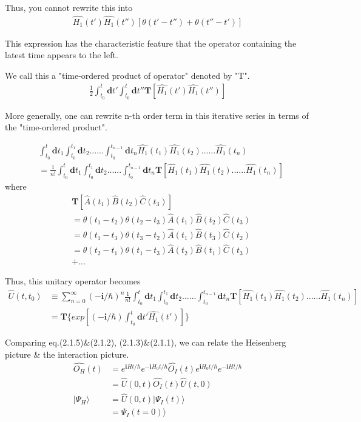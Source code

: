  Thus, you cannot rewrite this into
\begin{align}
\hat{H_1}(t')\hat{H_1}(t'')[\theta(t'-t'')+\theta(t''-t')] \nonumber
\end{align}

 This expression has the characteristic feature that the operator containing the latest  time appears to the left.

 We call this a "time-ordered product of operator" denoted by "T".
\begin{align}
\frac{1}{2}\int_{t_0}^{t}\bm{d}t'\int_{t_0}^{t}\bm{d}t''\bm{T}[\hat{H_1}(t')\hat{H_1}(t'')]\nonumber
\end{align}

 More generally, one can rewrite n-th order term in this iterative series in terms of the "time-ordered product".

\begin{align}\label{2-1-7}
&\int_{t_0}^{t}\bm{d}t_1\int_{t_0}^{t_1}\bm{d}t_2......\int_{t_0}^{t_{n-1}}\bm{d}t_n \hat{H_1}(t_1)\hat{H_1}(t_2)......\hat{H_1}(t_n)\nonumber \\
&= \frac{1}{n!}\int_{t_0}^{t}\bm{d}t_1\int_{t_0}^{t_1}\bm{d}t_2......\int_{t_0}^{t_{n-1}}\bm{d}t_n\bm{T}[\hat{H_1}(t_1)\hat{H_1}(t_2)......\hat{H_1}(t_n)]
\end{align}
where
\begin{align}
&\bm{T}[\hat{A}(t_1)\hat{B}(t_2)\hat{C}(t_3)] \nonumber \\
&=\theta(t_1-t_2)\theta(t_2-t_3)\hat{A}(t_1)\hat{B}(t_2)\hat{C}(t_3) \nonumber \\
&=\theta(t_1-t_3)\theta(t_3-t_2)\hat{A}(t_1)\hat{B}(t_3)\hat{C}(t_2) \nonumber \\
&=\theta(t_2-t_1)\theta(t_1-t_3)\hat{A}(t_2)\hat{B}(t_1)\hat{C}(t_3) \nonumber \\
&+ ... \nonumber
\end{align}

 Thus, this unitary operator becomes
\begin{align}
\hat{U}(t,t_0)&\equiv\sum_{n=0}^{\infty}(-\bm{i}/\hbar)^n\frac{1}{n!}\int_{t_0}^{t}\bm{d}t_1\int_{t_0}^{t_1}\bm{d}t_2......\int_{t_0}^{t_{n-1}}\bm{d}t_n\bm{T}[\hat{H_1}(t_1)\hat{H_1}(t_2)......\hat{H_1}(t_n)] \nonumber \\
&=\bm{T} \{exp[(-\bm{i}/\hbar)\int_{t_0}^{t}\bm{d}t'\hat{H_1}(t')]\}
\end{align}

 	Comparing eq.(2.1.5)\&(2.1.2), (2.1.3)\&(2.1.1), we can relate the Heisenberg picture \& the interaction picture.
\begin{align}
\hat{O_H}(t)&=e^{\bm{i}Ht/\hbar}e^{-\bm{i}H_0t/\hbar}\hat{O_I}(t)e^{\bm{i}H_0t/\hbar}e^{-\bm{i}Ht/\hbar} \nonumber \\
&=\hat{U}(0,t)\hat{O_I}(t)\hat{U}(t,0) \nonumber \\
|\Psi_H\rangle&=\hat{U}(0,t)|\Psi_I(t)\rangle \nonumber \\
&=\Psi_I(t=0)\rangle
\end{align}







